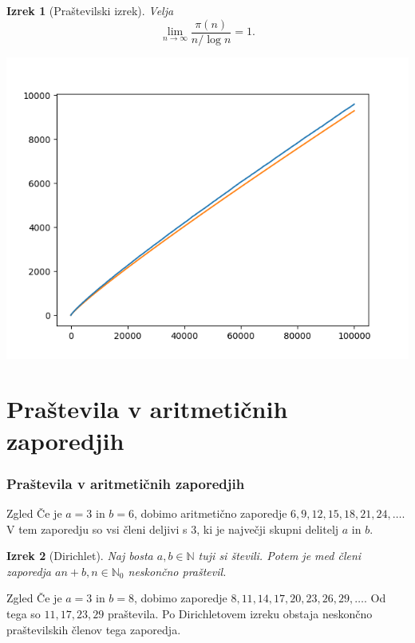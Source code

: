 \documentclass{beamer}
\newtheorem{izrek}{Izrek}
\def\N{\mathbb{N}}
\begin{document}

\begin{frame}
    \begin{izrek}[Praštevilski izrek]
        Velja $$\lim_{n \rightarrow \infty} \frac{\pi(n)}{n / \log{n}} = 1.$$
    \end{izrek}
\end{frame}


\begin{frame}
    \centering
    \includegraphics[height=0.95\textheight]{prime_number_theorem.png}
\end{frame}


\section{Praštevila v aritmetičnih zaporedjih}
\begin{frame}
    \frametitle{Praštevila v aritmetičnih zaporedjih}
    \pause
    \begin{exampleblock}{Zgled}
        Če je $a = 3$ in $b = 6$, dobimo aritmetično zaporedje $6, 9, 12, 15, 18, 21, 24, \ldots$. V tem zaporedju so vsi členi deljivi s $3$, ki je največji skupni delitelj $a$ in $b$.
    \end{exampleblock}
    \pause
    \medskip
    \begin{izrek}[Dirichlet]
        Naj bosta $a, b \in \N$ tuji si števili. Potem je med členi zaporedja $an + b, n \in \N_0$ neskončno praštevil.
    \end{izrek}
    \pause
    \medskip
    \begin{exampleblock}{Zgled}
        Če je $a = 3$ in $b = 8$, dobimo zaporedje $8, 11, 14, 17, 20, 23, 26, 29, \ldots$. Od tega so $11, 17, 23, 29$ praštevila. Po Dirichletovem izreku obstaja neskončno praštevilskih členov tega zaporedja.
    \end{exampleblock}
\end{frame}
\end{document}
